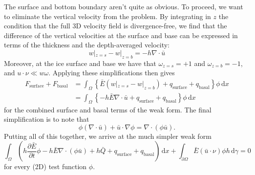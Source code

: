 \documentclass{article}
\theoremstyle{definition}
\theoremstyle{plain}
\newcommand{\ud}{\hspace{2pt}\mathrm{d}}
\begin{document}
The surface and bottom boundary aren't quite as obvious.
To proceed, we want to eliminate the vertical velocity from the problem.
By integrating in $z$ the condition that the full 3D velocity field is divergence-free, we find that the difference of the vertical velocities at the surface and base can be expressed in terms of the thickness and the depth-averaged velocity:
\begin{equation}
    w|_{z = s} - w|_{z = b} = -h\nabla\cdot\bar u
    \label{eq:vertical-velocity-difference}
\end{equation}
Moreover, at the ice surface and base we have that $\omega_{z = s} = +1$ and $\omega_{z = b} = -1$, and $u\cdot \nu \ll w\omega$.
Applying these simplifications then gives
\begin{align}
    F_{\text{surface}} + F_{\text{basal}} & = \int_\Omega \left\{\bar E(w|_{z = s} - w|_{z = b}) + q_{\text{surface}} + q_{\text{basal}}\right\}\phi \ud x \\
    & = \int_\Omega\left\{-h\bar E\nabla\cdot\bar u + q_{\text{surface}} + q_{\text{basal}}\right\}\phi\ud x
\end{align}
for the combined surface and basal terms of the weak form.
The final simplification is to note that
\begin{equation}
    \phi(\nabla\cdot \bar u) + \bar u\cdot\nabla\phi = \nabla\cdot(\phi\bar u).
\end{equation}
Putting all of this together, we arrive at the much simpler weak form
\begin{equation}
    \int_\Omega\left(h\frac{\partial\bar E}{\partial t}\phi - h\bar E\nabla\cdot(\phi\bar u) + h\bar Q + q_{\text{surface}} + q_{\text{basal}}\right)\ud x +\int_{\partial\Omega}\bar E(\bar u\cdot\nu)\phi h\ud\gamma = 0
\end{equation}
for every (2D) test function $\phi$.

\pagebreak



\end{document}
